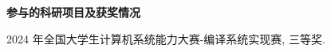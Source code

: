 \begin{publication}
\noindent\textbf{参与的科研项目及获奖情况}
\begin{publist}
\item 2024 年全国大学生计算机系统能力大赛-编译系统实现赛, 三等奖.
\end{publist}
\end{publication}
